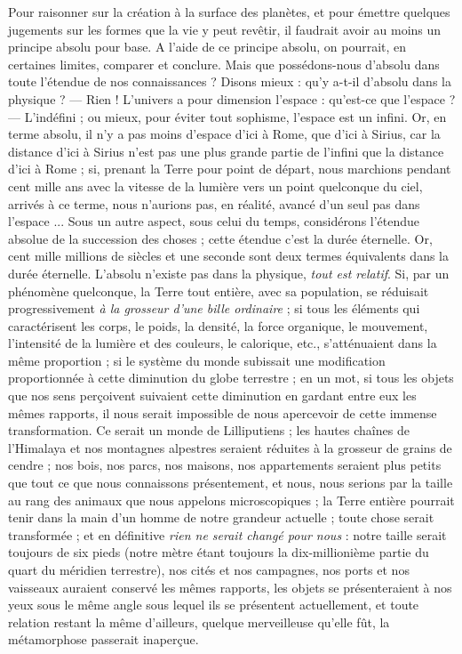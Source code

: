 \documentclass[a4paper, 11pt, oneside]{article}
\begin{document}
Pour raisonner sur la création à la surface des planètes, et pour émettre quelques jugements sur les formes que la vie y peut revêtir, il faudrait avoir au moins un principe absolu pour base. A l'aide de ce principe absolu, on pourrait, en certaines limites, comparer et conclure. Mais que possédons-nous d'absolu dans toute l'étendue de nos connaissances ? Disons mieux : qu'y a-t-il d'absolu dans la physique ? --- Rien ! L'univers a pour dimension l'espace : qu'est-ce que l'espace ? --- L'indéfini ; ou mieux, pour éviter tout sophisme, l'espace est un infini. Or, en terme absolu, il n'y a pas moins d'espace d'ici à Rome, que d'ici à Sirius, car la distance d'ici à Sirius n'est pas une plus grande partie de l'infini que la distance d'ici à Rome ; si, prenant la Terre pour point de départ, nous marchions pendant cent mille ans avec la vitesse de la lumière vers un point quelconque du ciel, arrivés à ce terme, nous n'aurions pas, en réalité, avancé d'un seul pas dans l'espace ... Sous un autre aspect, sous celui du temps, considérons l'étendue absolue de la succession des choses ; cette étendue c'est la durée éternelle. Or, cent mille millions de siècles et une seconde sont deux termes équivalents dans la durée éternelle. L'absolu n'existe pas dans la physique, \emph{tout est relatif}. Si, par un phénomène quelconque, la Terre tout entière, avec sa population, se réduisait progressivement \emph{à la grosseur d'une bille ordinaire} ; si tous les éléments qui caractérisent les corps, le poids, la densité, la force organique, le mouvement, l'intensité de la lumière et des couleurs, le calorique, etc., s'atténuaient dans la même proportion ; si le système du monde subissait une modification proportionnée à cette diminution du globe terrestre ; en un mot, si tous les objets que nos sens perçoivent suivaient cette diminution en gardant entre eux les mêmes rapports, il nous serait impossible de nous apercevoir de cette immense transformation. Ce serait un monde de Lilliputiens ; les hautes chaînes de l'Himalaya et nos montagnes alpestres seraient réduites à la grosseur de grains de cendre ; nos bois, nos parcs, nos maisons, nos appartements seraient plus petits que tout ce que nous connaissons présentement, et nous, nous serions par la taille au rang des animaux que nous appelons microscopiques ; la Terre entière pourrait tenir dans la main d'un homme de notre grandeur actuelle ; toute chose serait transformée ; et en définitive \emph{rien ne serait changé pour nous} : notre taille serait toujours de six pieds (notre mètre étant toujours la dix-millionième partie du quart du méridien terrestre), nos cités et nos campagnes, nos ports et nos vaisseaux auraient conservé les mêmes rapports, les objets se présenteraient à nos yeux sous le même angle sous lequel ils se présentent actuellement, et toute relation restant la même d'ailleurs, quelque merveilleuse qu'elle fût, la métamorphose passerait inaperçue.
\end{document}
